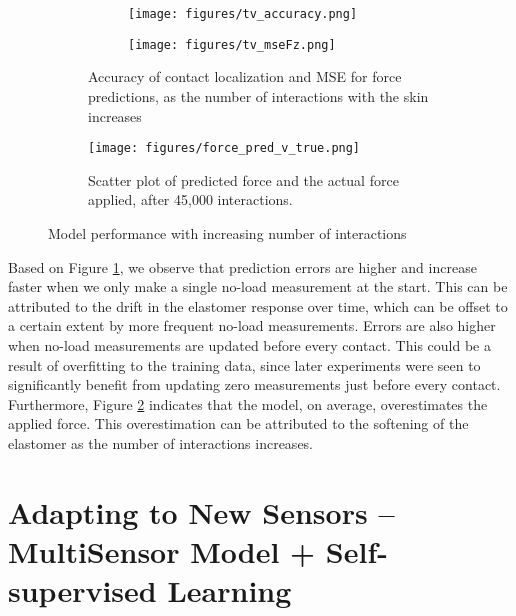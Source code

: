 \documentclass{article}
\begin{document}
\begin{figure}[h!]
    \centering
    \begin{subfigure}[t]{0.55\textwidth}
        \begin{subfigure}[t]{0.49\textwidth}
            \texttt{[image: figures/tv\_accuracy.png]}
        \end{subfigure}
        \begin{subfigure}[t]{0.49\textwidth}
            \texttt{[image: figures/tv\_mseFz.png]}
        \end{subfigure}
        \caption{Accuracy of contact localization and MSE for force predictions, as the number of interactions with the skin increases}
        \label{fig:learned_time_mse}
    \end{subfigure}
    \hfill
    \begin{subfigure}[t]{0.4\textwidth}
        \centering
        \texttt{[image: figures/force\_pred\_v\_true.png]}
        \caption{Scatter plot of predicted force and the actual force applied, after 45,000 interactions.}    
        \label{fig:learned_time_Fz_predvtrue}
    \end{subfigure}
    \caption{Model performance with increasing number of interactions}
    \label{fig:learned_time_variation}
    \vspace{-0.2in}
\end{figure}

Based on Figure \ref{fig:learned_time_mse}, we observe that prediction errors are higher and increase faster when we only make a single no-load measurement at the start. This can be attributed to the drift in the elastomer response over time, which can be offset to a certain extent by more frequent no-load measurements. Errors are also higher when no-load measurements are updated before every contact. This could be a result of overfitting to the training data, since later experiments were seen to significantly benefit from updating zero measurements just before every contact. Furthermore, Figure \ref{fig:learned_time_Fz_predvtrue} indicates that the model, on average, overestimates the applied force. This overestimation can be attributed to the softening of the elastomer as the number of interactions increases. 

\vspace{-0.1in}
\section{Adapting to New Sensors -- MultiSensor Model + Self-supervised Learning}
\vspace{-0.1in}
\label{sec:learning_and_adapting}
\end{document}
